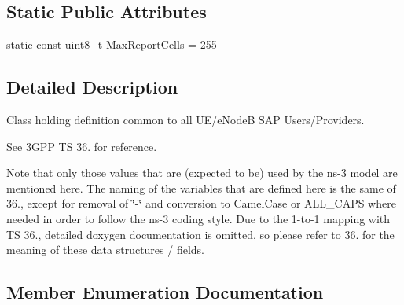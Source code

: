 \subsection*{Static Public Attributes}
\begin{DoxyCompactItemize}
\item 
static const uint8\+\_\+t \hyperlink{classns3_1_1LteRrcSap_a27fc843a140e11173bb8e2ac2b282126}{Max\+Report\+Cells} = 255
\end{DoxyCompactItemize}


\subsection{Detailed Description}
Class holding definition common to all U\+E/e\+NodeB S\+AP Users/\+Providers. 

See 3\+G\+PP TS 36. for reference.

Note that only those values that are (expected to be) used by the ns-\/3 model are mentioned here. The naming of the variables that are defined here is the same of 36., except for removal of \char`\"{}-\/\char`\"{} and conversion to Camel\+Case or A\+L\+L\+\_\+\+C\+A\+PS where needed in order to follow the ns-\/3 coding style. Due to the 1-\/to-\/1 mapping with TS 36., detailed doxygen documentation is omitted, so please refer to 36. for the meaning of these data structures / fields. 

\subsection{Member Enumeration Documentation}
